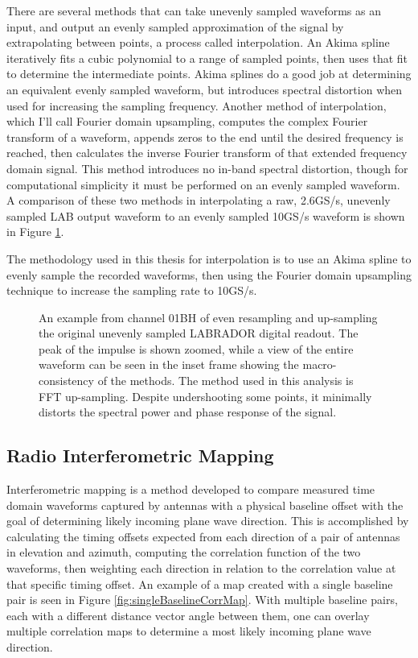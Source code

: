 		There are several methods that can take unevenly sampled waveforms as an input, and output an evenly sampled approximation of the signal by extrapolating between points, a process called interpolation.  An Akima spline iteratively fits a cubic polynomial to a range of sampled points, then uses that fit to determine the intermediate points.  Akima splines do a good job at determining an equivalent evenly sampled waveform, but introduces spectral distortion when used for increasing the sampling frequency.  Another method of interpolation, which I'll call Fourier domain upsampling, computes the complex Fourier transform of a waveform, appends zeros to the end until the desired frequency is reached, then calculates the inverse Fourier transform of that extended frequency domain signal.  This method introduces no in-band spectral distortion, though for computational simplicity it must be performed on an evenly sampled waveform.  A comparison of these two methods in interpolating a raw, 2.6GS/s, unevenly sampled LAB output waveform to an evenly sampled 10GS/s waveform is shown in Figure \ref{fig:interpolation}.
		
		The methodology used in this thesis for interpolation is to use an Akima spline to evenly sample the recorded waveforms, then using the Fourier domain upsampling technique to increase the sampling rate to 10GS/s.
		
\begin{figure}
\centering
{}
	\caption{An example from channel 01BH of even resampling and up-sampling the original unevenly sampled LABRADOR digital readout.  The peak of the impulse is shown zoomed, while a view of the entire waveform can be seen in the inset frame showing the macro-consistency of the methods.  The method used in this analysis is  FFT up-sampling.  Despite undershooting some points, it minimally distorts the spectral power and phase response of the signal.}
\label{fig:interpolation}
\end{figure}		
	
	\subsection{Radio Interferometric Mapping}
		Interferometric mapping is a method developed to compare measured time domain waveforms captured by antennas with a physical baseline offset with the goal of determining likely incoming plane wave direction.  This is accomplished by calculating the timing offsets expected from each direction of a pair of antennas in elevation and azimuth, computing the correlation function of the two waveforms, then weighting each direction in relation to the correlation value at that specific timing offset.  An example of a map created with a single baseline pair is seen in Figure \ref{fig:singleBaselineCorrMap}.  With multiple baseline pairs, each with a different distance vector angle between them, one can overlay multiple correlation maps to determine a most likely incoming plane wave direction.
		
